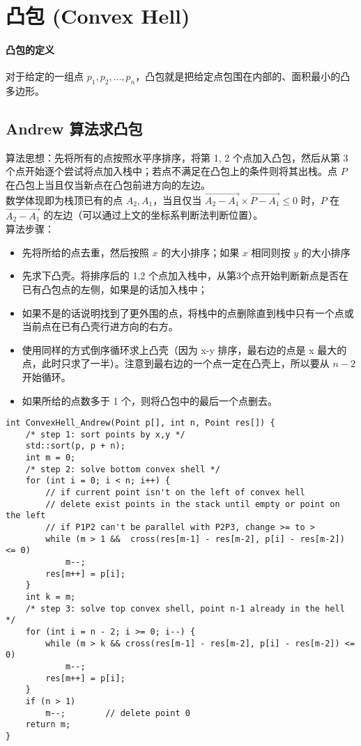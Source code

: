 \section{凸包 (Convex Hell)}

\paragraph{凸包的定义} 对于给定的一组点 $p_1, p_2, ..., p_n$，凸包就是把给定点包围在内部的、面积最小的凸多边形。

\subsection{Andrew 算法求凸包}

\noindent 算法思想：先将所有的点按照水平序排序，将第 1, 2 个点加入凸包，然后从第 3 个点开始逐个尝试将点加入栈中；若点不满足在凸包上的条件则将其出栈。点 $P$ 在凸包上当且仅当新点在凸包前进方向的左边。\\

\noindent 数学体现即为栈顶已有的点 $A_2, A_1$，当且仅当 $\vec{A_2 - A_1} \times \vec{P-A_1} \le 0$ 时，$P$ 在 $\vec{A_2-A_1}$ 的左边（可以通过上文的坐标系判断法判断位置）。\\

\noindent 算法步骤：
\begin{itemize}
    \item 先将所给的点去重，然后按照 $x$ 的大小排序；如果 $x$ 相同则按 $y$ 的大小排序
    \item 先求下凸壳。将排序后的 1,2 个点加入栈中，从第3个点开始判断新点是否在已有凸包点的左侧，如果是的话加入栈中；
    \item 如果不是的话说明找到了更外围的点，将栈中的点删除直到栈中只有一个点或当前点在已有凸壳行进方向的右方。
    \item 使用同样的方式倒序循环求上凸壳（因为 x-y 排序，最右边的点是 x 最大的点，此时只求了一半）。注意到最右边的一个点一定在凸壳上，所以要从 $n-2$ 开始循环。
    \item 如果所给的点数多于 1 个，则将凸包中的最后一个点删去。
\end{itemize}

\begin{verbatim}
int ConvexHell_Andrew(Point p[], int n, Point res[]) {
    /* step 1: sort points by x,y */
    std::sort(p, p + n); 
    int m = 0;
    /* step 2: solve bottom convex shell */
    for (int i = 0; i < n; i++) {
        // if current point isn't on the left of convex hell
        // delete exist points in the stack until empty or point on the left
        // if P1P2 can't be parallel with P2P3, change >= to >
        while (m > 1 &&  cross(res[m-1] - res[m-2], p[i] - res[m-2]) <= 0)
            m--;
        res[m++] = p[i];
    }
    int k = m;
    /* step 3: solve top convex shell, point n-1 already in the hell */
    for (int i = n - 2; i >= 0; i--) {
        while (m > k && cross(res[m-1] - res[m-2], p[i] - res[m-2]) <= 0)
            m--;
        res[m++] = p[i];
    }
    if (n > 1)
        m--;        // delete point 0
    return m;
}
\end{verbatim}

